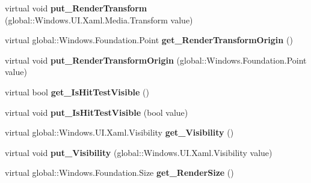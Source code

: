\begin{DoxyCompactItemize}
\item 
\mbox{\label{class_windows_1_1_u_i_1_1_xaml_1_1_u_i_element_af319cc6e684f42a4fb4719f262cf5f5d}} 
virtual void {\bfseries put\+\_\+\+Render\+Transform} (global\+::\+Windows.\+U\+I.\+Xaml.\+Media.\+Transform value)
\item 
\mbox{\label{class_windows_1_1_u_i_1_1_xaml_1_1_u_i_element_a160f3818573614194babfda698182355}} 
virtual global\+::\+Windows.\+Foundation.\+Point {\bfseries get\+\_\+\+Render\+Transform\+Origin} ()
\item 
\mbox{\label{class_windows_1_1_u_i_1_1_xaml_1_1_u_i_element_a3384cc317262d95a77573d76f771778d}} 
virtual void {\bfseries put\+\_\+\+Render\+Transform\+Origin} (global\+::\+Windows.\+Foundation.\+Point value)
\item 
\mbox{\label{class_windows_1_1_u_i_1_1_xaml_1_1_u_i_element_acafd318a1c0b56bfb701aec3a210bec1}} 
virtual bool {\bfseries get\+\_\+\+Is\+Hit\+Test\+Visible} ()
\item 
\mbox{\label{class_windows_1_1_u_i_1_1_xaml_1_1_u_i_element_a91c0826f6d39080d6e6c6bca0144cdb1}} 
virtual void {\bfseries put\+\_\+\+Is\+Hit\+Test\+Visible} (bool value)
\item 
\mbox{\label{class_windows_1_1_u_i_1_1_xaml_1_1_u_i_element_a28fb7dc5ba5e68bbf934a134e97777f2}} 
virtual global\+::\+Windows.\+U\+I.\+Xaml.\+Visibility {\bfseries get\+\_\+\+Visibility} ()
\item 
\mbox{\label{class_windows_1_1_u_i_1_1_xaml_1_1_u_i_element_aa21b9a45ef782cd5fe687bf2ad1b542a}} 
virtual void {\bfseries put\+\_\+\+Visibility} (global\+::\+Windows.\+U\+I.\+Xaml.\+Visibility value)
\item 
\mbox{\label{class_windows_1_1_u_i_1_1_xaml_1_1_u_i_element_ae8754f086fb49dc408bd75c4277a1aaa}} 
virtual global\+::\+Windows.\+Foundation.\+Size {\bfseries get\+\_\+\+Render\+Size} ()

\end{DoxyCompactItemize}
